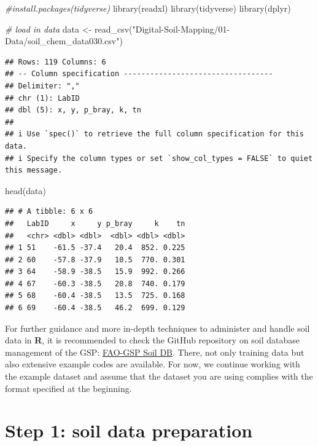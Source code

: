 \documentclass[
  10pt,
  b5paper,
  oneside]{book}
\newenvironment{Shaded}{\begin{snugshade}}{\end{snugshade}}
\newcommand{\CommentTok}[1]{\textcolor[rgb]{0.56,0.35,0.01}{\textit{#1}}}
\newcommand{\FunctionTok}[1]{\textcolor[rgb]{0.00,0.00,0.00}{#1}}
\newcommand{\NormalTok}[1]{#1}
\newcommand{\OtherTok}[1]{\textcolor[rgb]{0.56,0.35,0.01}{#1}}
\newcommand{\StringTok}[1]{\textcolor[rgb]{0.31,0.60,0.02}{#1}}
\begin{document}
\begin{Shaded}
\begin{Highlighting}[]
\CommentTok{\#install.packages(tidyverse)}
\FunctionTok{library}\NormalTok{(readxl)}
\FunctionTok{library}\NormalTok{(tidyverse)}
\FunctionTok{library}\NormalTok{(dplyr)}

\CommentTok{\# load in data}
\NormalTok{data }\OtherTok{\textless{}{-}} \FunctionTok{read\_csv}\NormalTok{(}\StringTok{"Digital{-}Soil{-}Mapping/01{-}Data/soil\_chem\_data030.csv"}\NormalTok{)}
\end{Highlighting}
\end{Shaded}

\begin{verbatim}
## Rows: 119 Columns: 6
## -- Column specification ----------------------------------
## Delimiter: ","
## chr (1): LabID
## dbl (5): x, y, p_bray, k, tn
## 
## i Use `spec()` to retrieve the full column specification for this data.
## i Specify the column types or set `show_col_types = FALSE` to quiet this message.
\end{verbatim}

\begin{Shaded}
\begin{Highlighting}[]
\FunctionTok{head}\NormalTok{(data)}
\end{Highlighting}
\end{Shaded}

\begin{verbatim}
## # A tibble: 6 x 6
##   LabID     x     y p_bray     k    tn
##   <chr> <dbl> <dbl>  <dbl> <dbl> <dbl>
## 1 51    -61.5 -37.4   20.4  852. 0.225
## 2 60    -57.8 -37.9   10.5  770. 0.301
## 3 64    -58.9 -38.5   15.9  992. 0.266
## 4 67    -60.3 -38.5   20.8  740. 0.179
## 5 68    -60.4 -38.5   13.5  725. 0.168
## 6 69    -60.4 -38.5   46.2  699. 0.129
\end{verbatim}

For further guidance and more in-depth techniques to administer and handle soil data in \textbf{R}, it is recommended to check the GitHub repository on soil database management of the GSP: \href{https://github.com/FAO-GSP/SoilDB}{FAO-GSP Soil DB}. There, not only training data but also extensive example codes are available.
For now, we continue working with the example dataset and assume that the dataset you are using complies with the format specified at the beginning.

\hypertarget{step-1-soil-data-preparation}{%
\chapter{Step 1: soil data preparation}\label{step-1-soil-data-preparation}}
\end{document}
